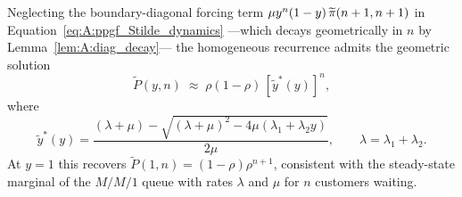 \begin{approximation}\label{apx:A:PPGF_Stilde}
    Neglecting the boundary-diagonal forcing term
    $\mu y^n(1-y)\,\widetilde{\pi}(n+1,n+1)$ in Equation~\eqref{eq:A:ppgf_Stilde_dynamics} ---which
    decays geometrically in $n$ by Lemma~\ref{lem:A:diag_decay}--- the
    homogeneous recurrence admits the geometric solution
    \begin{equation*}
        \widetilde{P}(y,n) \;\approx\; \rho(1-\rho)\,[\widetilde{y}^*(y)]^n,
    \end{equation*}
    where
    \begin{equation*}
        \widetilde{y}^*(y) = \frac{(\lambda+\mu) - \sqrt{(\lambda+\mu)^2 - 4\mu(\lambda_1+\lambda_2 y)}}{2\mu}, \qquad \lambda = \lambda_1+\lambda_2.
    \end{equation*}
    At $y=1$ this recovers $\widetilde{P}(1,n)=(1-\rho)\rho^{n+1}$, consistent with
    the steady-state marginal of the $M/M/1$ queue with rates $\lambda$ and $\mu$ for $n$ customers waiting.
\end{approximation}

